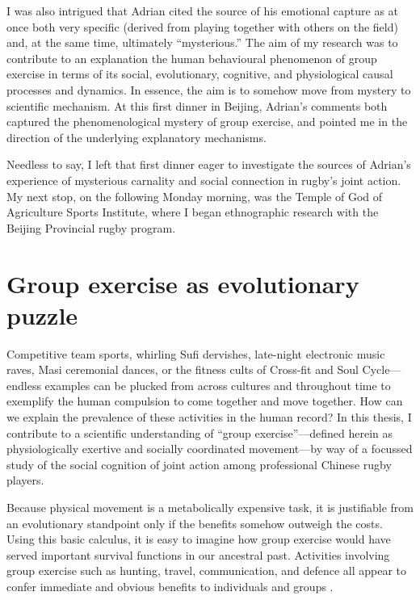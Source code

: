 \begin{CJK}{UTF8}{gbsn}
I was also intrigued that Adrian cited the source of his emotional capture as at once both very specific (derived from playing together with others on the field) and, at the same time, ultimately ``mysterious.''  The aim of my research was to contribute to an explanation the human behavioural phenomenon of group exercise in terms of its social, evolutionary, cognitive, and physiological causal processes and dynamics.  In essence, the aim is to somehow move from mystery to scientific mechanism.  At this first dinner in Beijing, Adrian's comments both captured the phenomenological mystery of group exercise, and pointed me in the direction of the underlying explanatory mechanisms.

Needless to say, I left that first dinner eager to investigate the sources of Adrian's experience of mysterious carnality and social connection in rugby's joint action.  My next stop, on the following Monday morning, was the Temple of God of Agriculture Sports Institute, where I began ethnographic research with the Beijing Provincial rugby program.


                            \begin{center}

                            \end{center}





\section{Group exercise as evolutionary puzzle}
Competitive team sports, whirling Sufi dervishes, late-night electronic music raves, Masi ceremonial dances, or the fitness cults of Cross-fit and Soul Cycle---endless examples can be plucked from across cultures and throughout time to exemplify the human compulsion to come together and move together.  How can we explain the prevalence of these activities in the human record?  In this thesis, I contribute to a scientific understanding of ``group exercise''---defined herein as physiologically exertive and socially coordinated movement---by way of a focussed study of the social cognition of joint action among professional Chinese rugby players.

Because physical movement is a metabolically expensive task, it is justifiable from an evolutionary standpoint only if the benefits somehow outweigh the costs.  Using this basic calculus, it is easy to imagine how group exercise would have served important survival functions in our ancestral past.  Activities involving group exercise such as hunting, travel, communication, and defence all appear to confer immediate and obvious benefits to individuals and groups \citep{Sands2010}.


\end{CJK}
